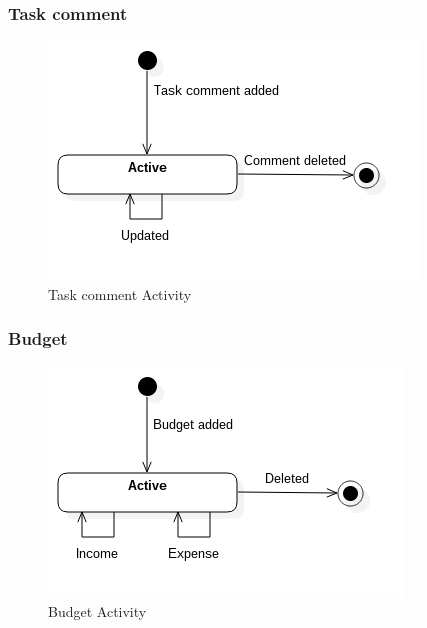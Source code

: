 \subsubsection*{Task comment}

\begin{figure}[H]
    \centering
    \includegraphics[scale=0.6]{Images/ProblemDomain/tcActivityDiagram.png}
    \caption{Task comment Activity}
    \label{fig:tcActivityDiagram}
\end{figure}

\subsubsection*{Budget}

\begin{figure}[H]
    \centering
    \includegraphics[scale=0.6]{Images/ProblemDomain/budgetActivityDiagram.png}
    \caption{Budget Activity}
    \label{fig:budgetActivityDiagram}
\end{figure}
















